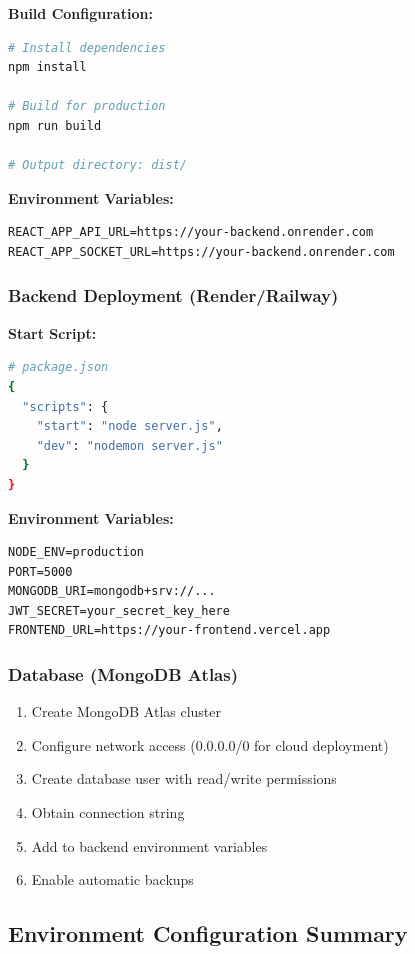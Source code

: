 \documentclass[12pt,a4paper]{article}
\begin{document}
\textbf{Build Configuration:}
\begin{lstlisting}[language=bash]
# Install dependencies
npm install

# Build for production
npm run build

# Output directory: dist/
\end{lstlisting}

\textbf{Environment Variables:}
\begin{lstlisting}
REACT_APP_API_URL=https://your-backend.onrender.com
REACT_APP_SOCKET_URL=https://your-backend.onrender.com
\end{lstlisting}

\subsubsection{Backend Deployment (Render/Railway)}

\textbf{Start Script:}
\begin{lstlisting}[language=bash]
# package.json
{
  "scripts": {
    "start": "node server.js",
    "dev": "nodemon server.js"
  }
}
\end{lstlisting}

\textbf{Environment Variables:}
\begin{lstlisting}
NODE_ENV=production
PORT=5000
MONGODB_URI=mongodb+srv://...
JWT_SECRET=your_secret_key_here
FRONTEND_URL=https://your-frontend.vercel.app
\end{lstlisting}

\subsubsection{Database (MongoDB Atlas)}

\begin{enumerate}
    \item Create MongoDB Atlas cluster
    \item Configure network access (0.0.0.0/0 for cloud deployment)
    \item Create database user with read/write permissions
    \item Obtain connection string
    \item Add to backend environment variables
    \item Enable automatic backups
\end{enumerate}

\subsection{Environment Configuration Summary}
\end{document}
